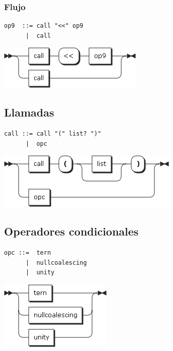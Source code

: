 \subsubsection{Flujo}
\begin{multicols}{2}
\begin{lstlisting}[style=nonumbers]      
op9  ::= call "<<" op9
      |  call
\end{lstlisting}  
\columnbreak	
\begin{center}
\includegraphics[scale=0.5]{diagram/op9.png} \\
\end{center}
\end{multicols}

\subsection{Llamadas}
\begin{multicols}{2}
\begin{lstlisting}[style=nonumbers]      
call ::= call "(" list? ")"
      |  opc
\end{lstlisting}  
\columnbreak	
\begin{center}
\includegraphics[scale=0.5]{diagram/call.png} \\
\end{center}
\end{multicols}

\subsection{Operadores condicionales}
\begin{multicols}{2}
\begin{lstlisting}[style=nonumbers]      
opc ::=  tern
      |  nullcoalescing
      |  unity
\end{lstlisting}  
\columnbreak	
\begin{center}
\includegraphics[scale=0.5]{diagram/opc.png} \\
\end{center}
\end{multicols}
